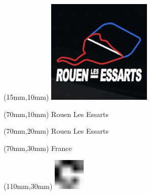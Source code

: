 \null\newpage
\begin{textblock*}{50mm}(15mm,10mm)%
\includegraphics[width=50mm]{LG/ROUE.png}
\end{textblock*}
\begin{textblock*}{130mm}(70mm,10mm)%
{\fontsize{20}{20}\selectfont Rouen Les Essarts}\\
\end{textblock*}
\begin{textblock*}{120mm}(70mm,20mm)%
{\fontsize{16}{16}\selectfont Rouen Les Essarts}\\
\end{textblock*}
\begin{textblock*}{120mm}(70mm,30mm)%
{\fontsize{12}{12}\selectfont France}
\end{textblock*}
\begin{textblock*}{30mm}(110mm,30mm)%
\centering
\includegraphics[height=15mm]{icons/fa-rotate-right.pdf}
\end{textblock*}
